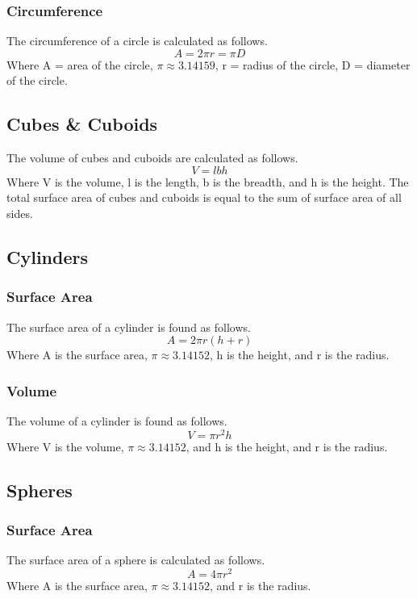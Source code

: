 \documentclass{report}
\begin{document}
\begin{flushleft}
\subsubsection{Circumference}
The circumference of a circle is calculated as follows.
\begin{equation}
A=2\pi r = \pi D
\end{equation}
Where A = area of the circle, $\pi \approx 3.14159$, r = radius of the circle, D = diameter of the circle.

\subsection{Cubes \& Cuboids}
The volume of cubes and cuboids are calculated as follows.
\begin{equation}
V=lbh
\end{equation}
Where V is the volume, l is the length, b is the breadth, and h is the height.
\newline
\newline
The total surface area of cubes and cuboids is equal to the sum of surface area of all sides.

\subsection{Cylinders}
\subsubsection{Surface Area}
The surface area of a cylinder is found as follows.
\begin{equation}
A=2\pi r \left(h + r\right)
\end{equation}
Where A is the surface area, $\pi \approx 3.14152$, h is the height, and r is the radius.

\subsubsection{Volume}
The volume of a cylinder is found as follows.
\begin{equation}
V=\pi r^2 h
\end{equation}
Where V is the volume, $\pi \approx 3.14152$, and h is the height, and r is the radius.

\subsection{Spheres}
\subsubsection{Surface Area}
The surface area of a sphere is calculated as follows.
\begin{equation}
A = 4\pi r^2
\end{equation}
Where A is the surface area, $\pi \approx 3.14152$, and r is the radius.


\end{flushleft}
\end{document}
